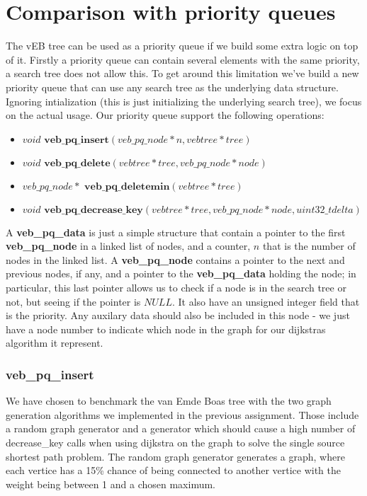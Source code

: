 \section*{Comparison with priority queues}
The vEB tree can be used as a priority queue if we build some extra logic on top of it. Firstly a priority queue can contain several elements with the same priority, a search tree does not allow this. To get around this limitation we've build a new priority queue that can use any search tree as the underlying data structure. Ignoring intialization (this is just initializing the underlying search tree), we focus on the actual usage. Our priority queue support the following operations:

\begin{itemize}
  \item $void \textbf{ veb\_pq\_insert}(veb\_pq\_node * n, vebtree * tree)$
  \item $void \textbf{ veb\_pq\_delete}(vebtree * tree, veb\_pq\_node * node)$
  \item $veb\_pq\_node * \textbf{ veb\_pq\_deletemin}(vebtree * tree)$
  \item $void \textbf{ veb\_pq\_decrease\_key}(vebtree * tree, veb\_pq\_node * node, uint32\_t delta)$
\end{itemize}
A \textbf{veb\_pq\_data} is just a simple structure that contain a pointer to the first \textbf{veb\_pq\_node} in a linked list of nodes, and a counter, $n$ that is the number of nodes in the linked list. A \textbf{veb\_pq\_node} contains a pointer to the next and previous nodes, if any, and a pointer to the \textbf{veb\_pq\_data} holding the node; in particular, this last pointer allows us to check if a node is in the search tree or not, but seeing if the pointer is $NULL$. It also have an unsigned integer field that is the priority. Any auxilary data should also be included in this node - we just have a node number to indicate which node in the graph for our dijkstras algorithm it represent.

\subsubsection*{\textbf{veb\_pq\_insert}}

We have chosen to benchmark the van Emde Boas tree with the two graph generation algorithms we implemented in the previous assignment.
Those include a random graph generator and a generator which should cause a high number of decrease\_key calls when using dijkstra on the graph to solve the single source shortest path problem.
The random graph generator generates a graph, where each vertice has a 15\% chance of being connected to another vertice with the weight being between 1 and a chosen maximum.

